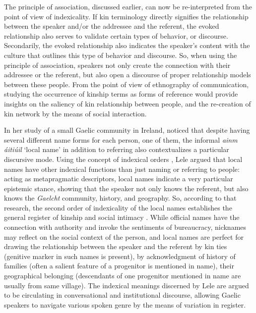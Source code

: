 \documentclass[12pt]{article}
\begin{document}
The principle of association, discussed earlier, can now be re-interpreted from the point of view of indexicality. If kin terminology directly signifies the relationship between the speaker and/or the addressee and the referent, the evoked relationship also serves to validate certain types of behavior, or discourse. Secondarily, the evoked relationship also indicates the speaker's content with the culture that outlines this type of behavior and discourse. So, when using the principle of association, speakers not only create the connection with their addressee or the referent, but also open a discourse of proper relationship models between these people. From the point of view of ethnography of communication, studying the occurrence of kinship terms as forms of reference would provide insights on the saliency of kin relationship between people, and the re-creation of kin network by the means of social interaction.

In her study of a small Gaelic community in Ireland, \textcite{lele2009} noticed that despite having several different name forms for each person, one of them, the informal \textit{ainm \'aiti\'uil} `local name' in addition to referring also contextualizes a particular discursive mode. Using the concept of indexical orders \parencite{silverstein2003}, Lele argued that local names have other indexical functions than just naming or referring to people: acting as metapragmatic descriptors, local names indicate a very particular epistemic stance, showing that the speaker not only knows the referent, but also knows the \textit{Gaelcht} community, history, and geography. So, according to that research, the second order of indexicality of the local names establishes the general register of kinship and social intimacy \parencite{lele2009}. While official names have the connection with authority and invoke the sentiments of bureaucracy, nicknames may reflect on the social context of the person, and local names are perfect for drawing the relationship between the speaker and the referent by kin ties (genitive marker in such names is present), by acknowledgment of history of families (often a salient feature of a progenitor is mentioned in name), their geographical belonging (descendants of one progenitor mentioned in name are usually from same village). The indexical meanings discerned by Lele are argued to be circulating in conversational and institutional discourse, allowing Gaelic speakers to navigate various spoken genre by the means of variation in register.
\end{document}
